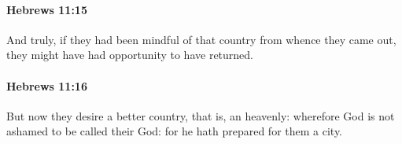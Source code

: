 		\paragraph{Hebrews 11:15} %
			\label{HEBREWS-11-15}

			And truly, if they had been mindful of that country from whence they came out, they might have had opportunity to have returned.

			\begin{framed}
			\scriptsize
				\begin{compactdesc}
					\item[SBLG] 
				\end{compactdesc}
			\end{framed}

		\paragraph{Hebrews 11:16} %
			\label{HEBREWS-11-16}

			But now they desire a better country, that is, an heavenly: wherefore God is not ashamed to be called their God: for he hath prepared for them a city.

